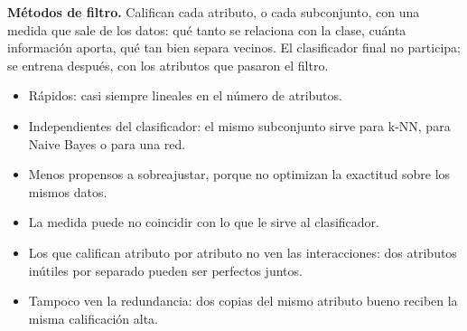 \documentclass[11pt,letterpaper]{article}
\begin{document}
\begin{center}
\end{center}

\textbf{Métodos de filtro.} Califican cada atributo, o cada
subconjunto, con una medida que sale de los datos: qué tanto se
relaciona con la clase, cuánta información aporta, qué tan bien separa
vecinos. El clasificador final no participa; se entrena después, con
los atributos que pasaron el filtro.

\begin{itemize}[itemsep=0.2em]
    \item[$+$] Rápidos: casi siempre lineales en el número de atributos.
    \item[$+$] Independientes del clasificador: el mismo subconjunto
          sirve para k-NN, para Naive Bayes o para una red.
    \item[$+$] Menos propensos a sobreajustar, porque no optimizan la
          exactitud sobre los mismos datos.
    \item[$-$] La medida puede no coincidir con lo que le sirve al
          clasificador.
    \item[$-$] Los que califican atributo por atributo no ven las
          interacciones: dos atributos inútiles por separado pueden ser
          perfectos juntos.
    \item[$-$] Tampoco ven la redundancia: dos copias del mismo atributo
          bueno reciben la misma calificación alta.
\end{itemize}
\end{document}
